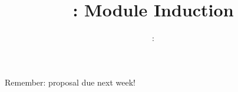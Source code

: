
\usepackage{../../beamerthemeFalmouthGamesAcademy}
\usepackage{multimedia}
\graphicspath{ {../../} }


\usepackage[normalem]{ulem}
\usepackage{wasysym}

\usepackage{pifont}%
\newcommand{\cmark}{\ding{51}}%
\newcommand{\xmark}{\ding{55}}%

\usepackage{algpseudocode}

\usepackage{pdfpages}

\usetikzlibrary{arrows,automata}




\title{\sessionnumber: Module Induction}
\subtitle{\modulecode: \moduletitle}

\frame{\titlepage} 





\begin{frame}
        \begin{center}
                \huge Remember: proposal due next week!
        \end{center}
\end{frame}


